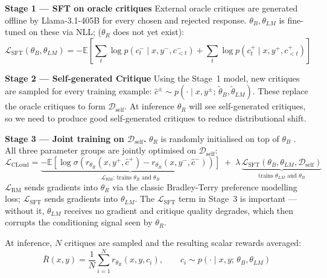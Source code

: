 \textbf{Stage 1 --- SFT on oracle critiques} External oracle critiques are generated offline by Llama-3.1-405B for every chosen and rejected response. $\theta_B ,\theta_{LM}$ is fine-tuned on these via NLL; ($\theta_R$ does not yet exist):
\begin{equation}
    \mathcal{L}_{\text{SFT}}(\theta_B, \theta_{LM}) = -\mathbb{E}\!\left[\sum_t \log p(c_t^- \mid x, y^-, c_{<t}^-) + \sum_t \log p(c_t^+ \mid x, y^+, c_{<t}^+)\right]
    \label{eq:cloud_sft}
\end{equation}

\textbf{Stage 2 --- Self-generated Critique} Using the Stage~1 model, new critiques are sampled for every training example: $\hat{c}^{\pm} \sim p(\cdot \mid x, y^{\pm};\,\tilde\theta_B, \tilde\theta_{LM})$. These replace the oracle critiques to form $\mathcal{D}_{\text{self}}$. At inference $\theta_R$ will see self-generated critiques, so we need to produce good self-generated critiques to reduce distributional shift.

\textbf{Stage 3 --- Joint training on $\mathcal{D}_{\text{self}}$.} $\theta_R$ is randomly initialised on top of $\theta_B$ . All three parameter groups are jointly optimised on $\mathcal{D}_{\text{self}}$:
\begin{equation}
    \mathcal{L}_{\text{CLoud}} = \underbrace{-\mathbb{E}\!\left[\log\sigma\!\left(r_{\theta_R}(x, y^+, \hat{c}^+) - r_{\theta_R}(x, y^-, \hat{c}^-)\right)\right]}_{\mathcal{L}_{\text{RM}}\text{: trains }\theta_R\text{ and }\theta_B} \;+\; \lambda\,\underbrace{\mathcal{L}_{\text{SFT}}(\theta_B, \theta_{LM}, \mathcal{D}_{\text{self}})}_{\text{trains }\theta_{LM}\text{ and }\theta_B}
    \label{eq:cloud}
\end{equation}
$\mathcal{L}_{\text{RM}}$ sends gradients into $\theta_R$ via the classic Bradley-Terry preference modelling loss; $\mathcal{L}_{\text{SFT}}$ sends gradients into $\theta_{LM}$. The $\mathcal{L}_{\text{SFT}}$ term in Stage~3 is important --- without it, $\theta_{LM}$ receives no gradient and critique quality degrades, which then corrupts the conditioning signal seen by $\theta_R$.

At inference, $N$ critiques are sampled and the resulting scalar rewards averaged:
\begin{equation}
    \bar{R}(x, y) = \frac{1}{N}\sum_{i=1}^{N} r_{\theta_R}\!\left(x, y, c_i\right), \qquad c_i \sim p(\cdot \mid x, y;\,\theta_B, \theta_{LM})
    \label{eq:cloud_sc}
\end{equation}

